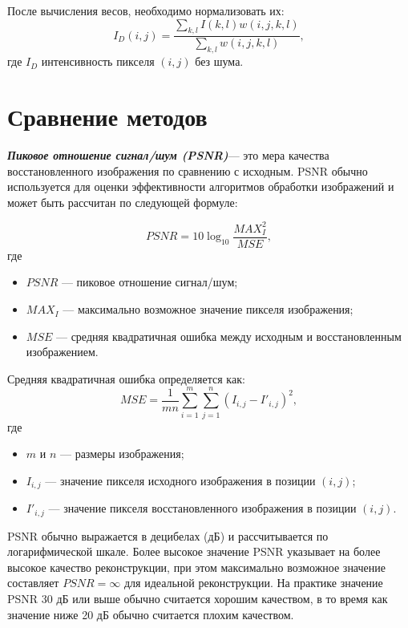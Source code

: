 После вычисления весов, необходимо нормализовать их:
\begin{equation}
	I_D(i, j) = \frac{\sum_{k, l} I(k, l) w(i, j, k, l)}{\sum_{k, l} w(i, j, k, l)},
\end{equation}
где $I_D$ интенсивность пикселя $(i, j)$ без шума.

\section{Сравнение методов}

\textbf{\textit{Пиковое отношение сигнал/шум (PSNR)}}--- это мера качества восстановленного изображения по сравнению с исходным\cite{metrics}. PSNR обычно используется для оценки эффективности алгоритмов обработки изображений и может быть рассчитан по следующей формуле:

\begin{equation}
    PSNR = 10 \log_{10} \frac{MAX_{I}^2}{MSE},
\end{equation}
где
\begin{itemize}
    \item $PSNR$ --- пиковое отношение сигнал/шум;
    \item $MAX_{I}$ --- максимально возможное значение пикселя изображения;
    \item $MSE$ --- средняя квадратичная ошибка между исходным и восстановленным изображением.
\end{itemize}

Средняя квадратичная ошибка определяется как:
\begin{equation}
    MSE = \frac{1}{mn} \sum_{i=1}^{m} \sum_{j=1}^{n} (I_{i,j} - I'_{i,j})^2,
\end{equation}
где
\begin{itemize}
    \item $m$ и $n$ --- размеры изображения;
    \item $I_{i,j}$ --- значение пикселя исходного изображения в позиции $(i,j)$;
    \item $I'_{i,j}$ --- значение пикселя восстановленного изображения в позиции $(i,j)$.
\end{itemize}

PSNR обычно выражается в децибелах (дБ) и рассчитывается по логарифмической шкале. Более высокое значение PSNR указывает на более высокое качество реконструкции, при этом максимально возможное значение составляет $PSNR = \infty$ для идеальной реконструкции. На практике значение PSNR 30 дБ или выше обычно считается хорошим качеством, в то время как значение ниже 20 дБ обычно считается плохим качеством.

